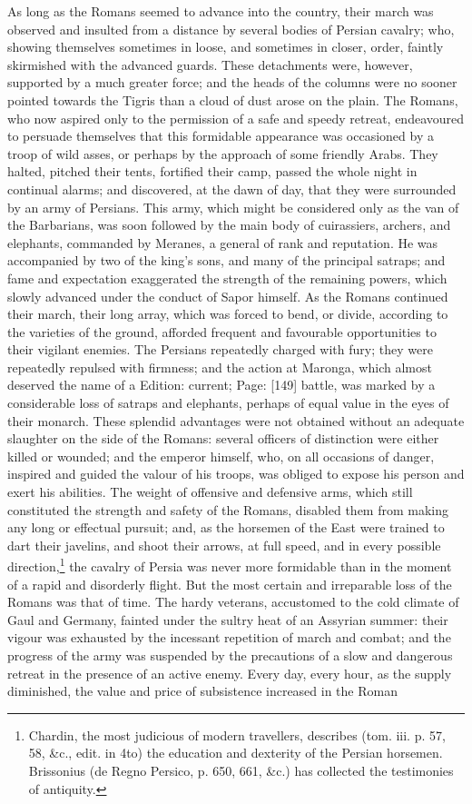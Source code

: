 As long as the Romans seemed to advance into the country, their march was observed and insulted from a distance by several bodies of Persian cavalry; who, showing themselves sometimes in loose, and sometimes in closer, order, faintly skirmished with the advanced guards. These detachments were, however, supported by a much greater force; and the heads of the columns were no sooner pointed towards the Tigris than a cloud of dust arose on the plain. The Romans, who now aspired only to the permission of a safe and speedy retreat, endeavoured to persuade themselves that this formidable appearance was occasioned by a troop of wild asses, or perhaps by the approach of some friendly Arabs. They halted, pitched their tents, fortified their camp, passed the whole night in continual alarms; and discovered, at the dawn of day, that they were surrounded by an army of Persians. This army, which might be considered only as the van of the Barbarians, was soon followed by the main body of cuirassiers, archers, and elephants, commanded by Meranes, a general of rank and reputation. He was accompanied by two of the king\texthebrew{}’s sons, and many of the principal satraps; and fame and expectation exaggerated the strength of the remaining powers, which slowly advanced under the conduct of Sapor himself. As the Romans continued their march, their long array, which was forced to bend, or divide, according to the varieties of the ground, afforded frequent and favourable opportunities to their vigilant enemies. The Persians repeatedly charged with fury; they were repeatedly repulsed with firmness; and the action at Maronga, which almost deserved the name of a Edition: current; Page: [149] battle, was marked by a considerable loss of satraps and elephants, perhaps of equal value in the eyes of their monarch. These splendid advantages were not obtained without an adequate slaughter on the side of the Romans: several officers of distinction were either killed or wounded; and the emperor himself, who, on all occasions of danger, inspired and guided the valour of his troops, was obliged to expose his person and exert his abilities. The weight of offensive and defensive arms, which still constituted the strength and safety of the Romans, disabled them from making any long or effectual pursuit; and, as the horsemen of the East were trained to dart their javelins, and shoot their arrows, at full speed, and in every possible direction,\footnote{Chardin, the most judicious of modern travellers, describes (tom. iii. p. 57, 58, \&c., edit. in 4to) the education and dexterity of the Persian horsemen. Brissonius (de Regno Persico, p. 650, 661, \&c.) has collected the testimonies of antiquity.} the cavalry of Persia was never more formidable than in the moment of a rapid and disorderly flight. But the most certain and irreparable loss of the Romans was that of time. The hardy veterans, accustomed to the cold climate of Gaul and Germany, fainted under the sultry heat of an Assyrian summer: their vigour was exhausted by the incessant repetition of march and combat; and the progress of the army was suspended by the precautions of a slow and dangerous retreat in the presence of an active enemy. Every day, every hour, as the supply diminished, the value and price of subsistence increased in the Roman 